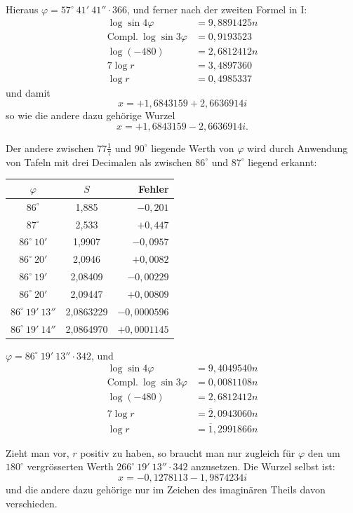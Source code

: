 \documentclass[12pt,a4paper]{article}
\newcommand{\1}{\ensuremath{\mathrlap{\,|\,}}} %
\begin{document}
Hieraus $\varphi = 57^{\circ}\ 41'\ 41''\!\!\cdot\!366$, und ferner nach der zweiten Formel in I:
\begin{align*}
\log\sin 4\varphi &= 9{,}8891425n\\
\text{Compl.}\ \log\sin 3\varphi &= 0{,}9193523\\
\log(-480) &= 2{,}6812412n\\
7\log r &= 3{,}4897360\\
\log r &= 0{,}4985337
\end{align*}
und damit
\[x = +1{,}6843159 + 2{,}6636914i\]
so wie die andere dazu gehörige Wurzel
\[x = +1{,}6843159 - 2{,}6636914i.\]

Der andere zwischen $77\frac{1}{7}$ und $90^{\circ}$ liegende Werth von $\varphi$ wird durch Anwendung von Tafeln mit drei Decimalen als zwischen $86^{\circ}$ und $87^{\circ}$ liegend erkannt:

\begin{center}
\begin{tabular}{ccr}
$\varphi$ & $S$ & Fehler \\ \midrule
$86^{\circ}$ & 1,885 & $-0{,}201$ \\
$87^{\circ}$ & 2,533 & $+0{,}447$ \\
$86^{\circ}\ 10'$ & 1,9907 & $-0{,}0957$ \\
$86^{\circ}\ 20'$ & 2,0946 & $+0{,}0082$ \\
$86^{\circ}\ 19'$ & 2,08409 & $-0{,}00229$ \\
$86^{\circ}\ 20'$ & 2,09447 & $+0{,}00809$ \\
$86^{\circ}\ 19'\ 13''$ & 2,0863229 & $-0{,}0000596$ \\
$86^{\circ}\ 19'\ 14''$ & 2,0864970 & $+0{,}0001145$
\end{tabular}
\end{center}

$\varphi = 86^{\circ}\ 19'\ 13''\!\!\cdot\!342$, und
\begin{align*}
\log\sin 4\varphi &= 9{,}4049540n\\
\text{Compl.}\ \log\sin 3\varphi &= 0{,}0081108n\\
\log(-480) &= 2{,}6812412n\\
7\log r &= \overline{2}{,}0943060n\\
\log r &= \overline{1}{,}2991866n
\end{align*}

Zieht man vor, $r$ positiv zu haben, so braucht man nur zugleich für $\varphi$ den um $180^{\circ}$ vergrösserten Werth $266^{\circ}\ 19'\ 13''\!\!\cdot\!342$ anzusetzen. Die Wurzel selbst ist:
\[x = -0{,}1278113 - 1{,}9874234i\]
und die andere dazu gehörige nur im Zeichen des imaginären Theils davon verschieden.
\end{document}
